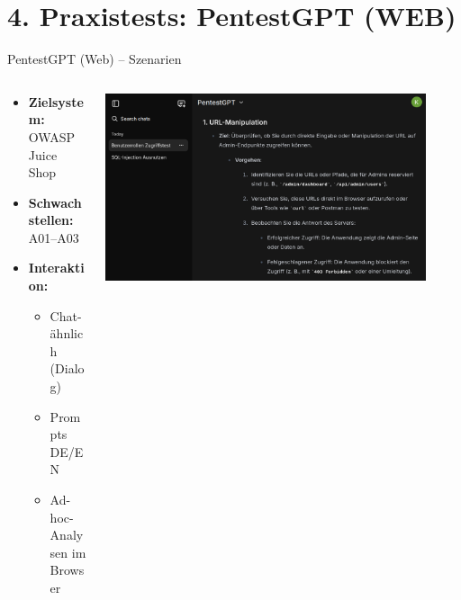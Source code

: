 \documentclass[
	aspectratio=169,	%
	onlytextwidth,		%
	t,					%
	]{beamer}
\begin{document}
\section{4. Praxistests: PentestGPT (WEB)}
\begin{frame}{PentestGPT (Web) – Szenarien}
	\begin{columns}
		\begin{column}[T]{.4\textwidth}
			\begin{itemize}
				\item \textbf{Zielsystem:} OWASP Juice Shop
				\vspace{2mm}
				\item \textbf{Schwachstellen:} A01–A03 
				\vspace{2mm}
				\item \textbf{Interaktion:}
				\begin{itemize}
					\item Chat-ähnlich (Dialog)
					\item Prompts DE/EN
					\item Ad-hoc-Analysen im Browser
				\end{itemize}
			\end{itemize}
		\end{column}
		\begin{column}[T]{.6\textwidth}
			\centering
			\includegraphics[width=0.9\textwidth]{figures/22.png}
			\label{fig:22}
		\end{column}
	\end{columns}
\end{frame}
\end{document}
